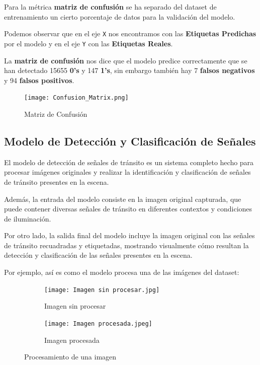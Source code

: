     \vspace{0.2cm}
 
    Para la métrica \textbf{matriz de confusión} se ha separado del dataset de entrenamiento un cierto porcentaje de datos para la validación del modelo.

    Podemos observar que en el eje \texttt{X} nos encontramos con las \textbf{Etiquetas Predichas} por el modelo y en el eje \texttt{Y} con las \textbf{Etiquetas Reales}.

    La \textbf{matriz de confusión} nos dice que el modelo predice correctamente que se han detectado 15655 \textbf{0's} y 147 \textbf{1's}, sin embargo también hay  7 \textbf{falsos negativos} y 94 \textbf{falsos positivos}.

    \vspace{0.4cm}
    
    \begin{figure}[ht]
	    \centering
		\texttt{[image: Confusion\_Matrix.png]}
		\caption{Matriz de Confusión}
	\end{figure}

    
    \subsection{Modelo de Detección y Clasificación de Señales}
    El modelo de detección de señales de tránsito es un sistema completo hecho para procesar imágenes originales y realizar la identificación y clasificación de señales de tránsito presentes en la escena.

    Además, la entrada del modelo consiste en la imagen original capturada, que puede contener diversas señales de tránsito en diferentes contextos y condiciones de iluminación.

    Por otro lado, la salida final del modelo incluye la imagen original con las señales de tránsito recuadradas y etiquetadas, mostrando visualmente cómo resultan la detección y clasificación de las señales presentes en la escena.

    \pagebreak

    Por ejemplo, así es como el modelo procesa una de las imágenes del dataset:

    \begin{figure}[ht]
			\centering
			\begin{subfigure}[t]{.47\textwidth}
				\centering
				\texttt{[image: Imagen sin procesar.jpg]}
                \caption{Imagen sin procesar}
			\end{subfigure}
			\begin{subfigure}[t]{.47\textwidth}
				\centering
				\texttt{[image: Imagen procesada.jpeg]}
                \caption{Imagen procesada}
			\end{subfigure}
			\caption{Procesamiento de una imagen}
	\end{figure}	

